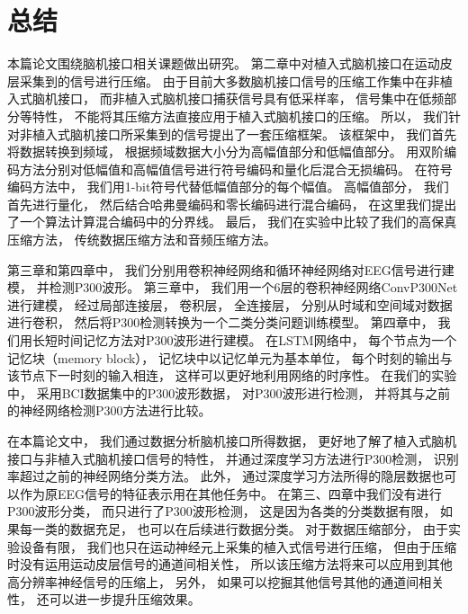 \chapter{总结}

本篇论文围绕脑机接口相关课题做出研究。 第二章中对植入式脑机接口在运动皮层采集到的信号进行压缩。 由于目前大多数脑机接口信号的压缩工作集中在非植入式脑机接口， 而非植入式脑机接口捕获信号具有低采样率， 信号集中在低频部分等特性， 不能将其压缩方法直接应用于植入式脑机接口的压缩。 所以， 我们针对非植入式脑机接口所采集到的信号提出了一套压缩框架。 该框架中， 我们首先将数据转换到频域， 根据频域数据大小分为高幅值部分和低幅值部分。 用双阶编码方法分别对低幅值和高幅值信号进行符号编码和量化后混合无损编码。 在符号编码方法中， 我们用1-bit符号代替低幅值部分的每个幅值。 高幅值部分， 我们首先进行量化， 然后结合哈弗曼编码和零长编码进行混合编码， 在这里我们提出了一个算法计算混合编码中的分界线。 最后， 我们在实验中比较了我们的高保真压缩方法， 传统数据压缩方法和音频压缩方法。 

第三章和第四章中， 我们分别用卷积神经网络和循环神经网络对EEG信号进行建模， 并检测P300波形。 第三章中， 我们用一个6层的卷积神经网络ConvP300Net进行建模， 经过局部连接层， 卷积层， 全连接层， 分别从时域和空间域对数据进行卷积， 然后将P300检测转换为一个二类分类问题训练模型。 第四章中， 我们用长短时间记忆方法对P300波形进行建模。 在LSTM网络中， 每个节点为一个记忆块（memory block）， 记忆块中以记忆单元为基本单位， 每个时刻的输出与该节点下一时刻的输入相连， 这样可以更好地利用网络的时序性。 在我们的实验中， 采用BCI数据集中的P300波形数据， 对P300波形进行检测， 并将其与之前的神经网络检测P300方法进行比较。 

在本篇论文中， 我们通过数据分析脑机接口所得数据， 更好地了解了植入式脑机接口与非植入式脑机接口信号的特性， 并通过深度学习方法进行P300检测， 识别率超过之前的神经网络分类方法。 此外， 通过深度学习方法所得的隐层数据也可以作为原EEG信号的特征表示用在其他任务中。 在第三、四章中我们没有进行P300波形分类， 而只进行了P300波形检测， 这是因为各类的分类数据有限， 如果每一类的数据充足， 也可以在后续进行数据分类。 对于数据压缩部分， 由于实验设备有限， 我们也只在运动神经元上采集的植入式信号进行压缩， 但由于压缩时没有运用运动皮层信号的通道间相关性， 所以该压缩方法将来可以应用到其他高分辨率神经信号的压缩上， 另外， 如果可以挖掘其他信号其他的通道间相关性， 还可以进一步提升压缩效果。


